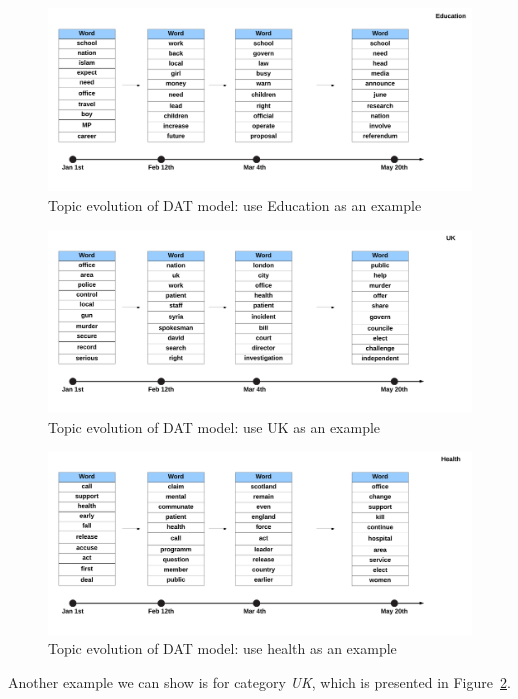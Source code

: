 \begin{figure}[h]
\centering
\includegraphics[width=1\textwidth]{figures/dat_education_tc.png}
\caption{Topic evolution of DAT model: use Education as an example}
\label{fig:dat_education_tc}
\end{figure}
\begin{figure}[h]
\centering
\includegraphics[width=1\textwidth]{figures/dat_uk_tc.png}
\caption{Topic evolution of DAT model: use UK as an example}
\label{fig:dat_uk_tc}
\end{figure}
\begin{figure}[h]
\centering
\includegraphics[width=1\textwidth]{figures/dat_health_tc.png}
\caption{Topic evolution of DAT model: use health as an example}
\label{fig:dat_health_tc}
\end{figure}

Another example we can show is for category \textit{UK}, which is presented in Figure~\ref{fig:dat_uk_tc}.

